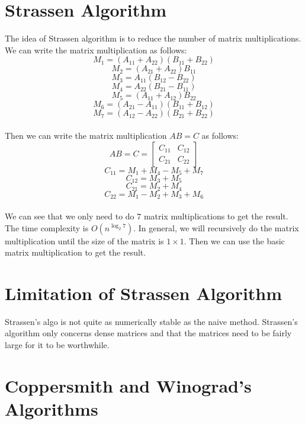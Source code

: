 \documentclass{article}
\begin{document}
\section{Strassen Algorithm}
The idea of Strassen algorithm is to reduce the number of matrix multiplications.
We can write the matrix multiplication as follows:
\begin{equation}
    M_1 = (A_{11} + A_{22})(B_{11} + B_{22})
\end{equation}
\begin{equation}
    M_2 = (A_{21} + A_{22})B_{11}
\end{equation}
\begin{equation}
    M_3 = A_{11}(B_{12} - B_{22})
\end{equation}
\begin{equation}
    M_4 = A_{22}(B_{21} - B_{11})
\end{equation}
\begin{equation}
    M_5 = (A_{11} + A_{12})B_{22}
\end{equation}
\begin{equation}
    M_6 = (A_{21} - A_{11})(B_{11} + B_{12})
\end{equation}
\begin{equation}
    M_7 = (A_{12} - A_{22})(B_{21} + B_{22})
\end{equation}\\
Then we can write the matrix multiplication $AB = C$ as follows:
\begin{equation}
    AB = C = \begin{bmatrix}
        C_{11} & C_{12} \\
        C_{21} & C_{22}
    \end{bmatrix}
\end{equation}
\begin{equation}
    C_{11} = M_1 + M_4 - M_5 + M_7
\end{equation}
\begin{equation}
    C_{12} = M_3 + M_5
\end{equation}
\begin{equation}
    C_{21} = M_2 + M_4
\end{equation}
\begin{equation}
    C_{22} = M_1 - M_2 + M_3 + M_6
\end{equation}\\
We can see that we only need to do $7$ matrix multiplications to get the result. The time complexity is $O(n^{\log_2 7})$.
In general, we will recursively do the matrix multiplication until the size of the matrix is $1 \times 1$.
Then we can use the basic matrix multiplication to get the result.

\section{Limitation of Strassen Algorithm}
Strassen's algo is not quite as numerically stable as the naive method. Strassen's algorithm only concerns dense matrices and that the matrices need to be fairly large for it to be worthwhile.

\section{Coppersmith and Winograd's Algorithms}
\end{document}

